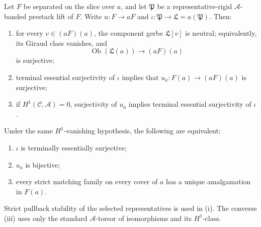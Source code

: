 \begin{theorem}
\label{thm:canonical-lift-rigidity}
Let \(F\) be separated on the slice over \(a\), and let \(\mathfrak P\) be a
representative-rigid \(\mathscr A\)-banded prestack lift of \(F\).  Write
\(u:F\to aF\) and \(\iota:\mathfrak P\to\mathfrak L=a(\mathfrak P)\).
Then:
\begin{enumerate}[label=(\roman*),nosep]
\item for every \(v\in(aF)(a)\), the component gerbe
      \(\mathfrak L[v]\) is neutral; equivalently, its Giraud class
      vanishes, and
      \[
      \operatorname{Ob}(\mathfrak L(a))\longrightarrow(aF)(a)
      \]
      is surjective;
\item terminal essential surjectivity of \(\iota\) implies that
      \(u_a:F(a)\to(aF)(a)\) is surjective;
\item if \(H^1(\mathcal C,\mathscr A)=0\), surjectivity of \(u_a\) implies
      terminal essential surjectivity of \(\iota\).
\end{enumerate}
Under the same \(H^1\)-vanishing hypothesis, the following are equivalent:
\begin{enumerate}[label=(\alph*),nosep]
\item \(\iota\) is terminally essentially surjective;
\item \(u_a\) is bijective;
\item every strict matching family on every cover of \(a\) has a unique
      amalgamation in \(F(a)\).
\end{enumerate}
Strict pullback stability of the selected representatives is used in
\textup{(i)}.  The converse \textup{(iii)} uses only the standard
\(\mathscr A\)-torsor of isomorphisms and its \(H^1\)-class.
\end{theorem}

